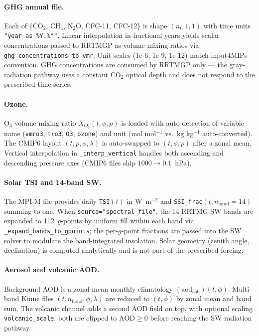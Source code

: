 \documentclass[11pt,twoside]{report}
\begin{document}
\paragraph{GHG annual file.}
Each of \{CO$_2$, CH$_4$, N$_2$O, CFC-11, CFC-12\} is shape
$(n_t,1,1)$ with time units \texttt{"year as \%Y.\%f"}.  Linear
interpolation in fractional years yields scalar concentrations passed to
RRTMGP as volume mixing ratios via
\texttt{ghg\_concentrations\_to\_vmr}.  Unit scales (1e-6, 1e-9, 1e-12)
match input4MIPs convention.  GHG concentrations are consumed by
RRTMGP only --- the gray-radiation pathway uses a constant CO$_2$
optical depth and does not respond to the prescribed time series.

\paragraph{Ozone.}
$\mathrm{O}_3$ volume mixing ratio $X_{O_3}(t,\phi,p)$ is loaded with
auto-detection of variable name (\texttt{vmro3}, \texttt{tro3},
\texttt{O3}, \texttt{ozone}) and unit (mol mol$^{-1}$ vs.\ kg kg$^{-1}$
auto-converted).  The CMIP6 layout $(t,p,\phi,\lambda)$ is auto-swapped
to $(t,\phi,p)$ after a zonal mean.  Vertical interpolation in
\texttt{\_interp\_vertical} handles both ascending and descending
pressure axes (CMIP6 files ship $1000 \to 0.1$~hPa).

\paragraph{Solar TSI and 14-band SW.}
The MPI-M file provides daily \texttt{TSI}$(t)$ in W~m$^{-2}$ and
\texttt{SSI\_frac}$(t,n_{\mathrm{band}}{=}14)$ summing to one.  When
\texttt{source="spectral\_file"}, the 14 RRTMG-SW bands are expanded to
112~$g$-points by uniform fill within each band via
\texttt{\_expand\_bands\_to\_gpoints}; the per-$g$-point fractions are
passed into the SW solver to modulate the band-integrated insolation.
Solar geometry (zenith angle, declination) is computed analytically and
is not part of the prescribed forcing.

\paragraph{Aerosol and volcanic AOD.}
Background AOD is a zonal-mean monthly climatology
$(\mathrm{aod}_{550})(t,\phi)$.  Multi-band Kinne files
$(t, n_{\mathrm{band}}, \phi, \lambda)$ are reduced to $(t, \phi)$ by
zonal mean and band sum.  The volcanic channel adds a second AOD field
on top, with optional scaling \texttt{volcanic\_scale}; both are clipped
to $\mathrm{AOD} \ge 0$ before reaching the SW radiation pathway.
\end{document}

